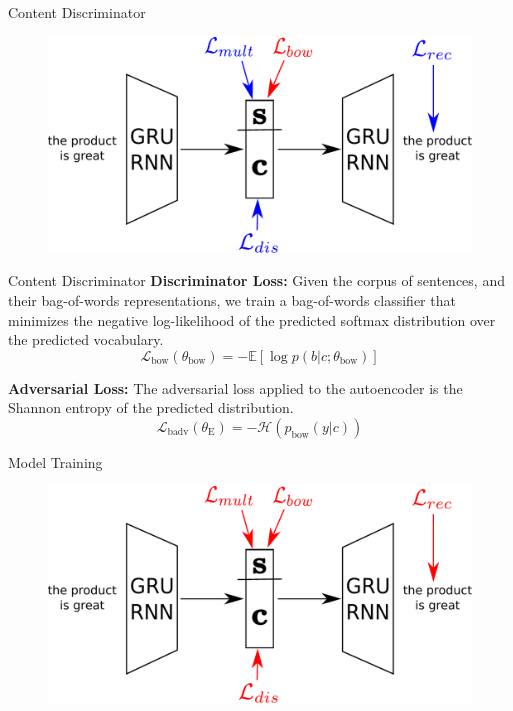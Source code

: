 \documentclass[aspectratio=169]{beamer}
\newcommand{\loss}[1]{\mathcal{L}_{\text{#1}}}
\newcommand{\param}[1]{\theta_{\text{#1}}}
\begin{document}
\begin{frame}{Content Discriminator}
	\centering
	\begin{figure}[ht]
		\includegraphics[width=\textwidth]{images/overview-training-4}
	\end{figure}
\end{frame}

\begin{frame}{Content Discriminator}
	\textbf{Discriminator Loss:}
	Given the corpus of sentences, and their bag-of-words representations, we train a bag-of-words classifier that minimizes the negative log-likelihood of the predicted softmax distribution over the predicted vocabulary.
	\begin{equation} \label{eqn:bow-disc-loss}
		\loss{bow}(\param{bow}) = - \mathbb{E} [\log p(b|c;\param{bow})]
	\end{equation}

	\textbf{Adversarial Loss:}
	The adversarial loss applied to the autoencoder is the Shannon entropy of the predicted distribution.
	\begin{equation}
		\loss{badv}(\param{E}) = - \mathcal{H}(p_\text{bow}(y|c))
	\end{equation}
\end{frame}

\begin{frame}{Model Training}
	\centering
	\begin{figure}[ht]
		\includegraphics[width=\textwidth]{images/overview-training-all}
	\end{figure}
\end{frame}
\end{document}
